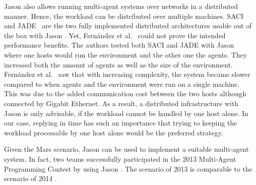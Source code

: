 Jason also allows running multi-agent systems over networks in a distributed manner. Hence, the workload can be distributed over multiple machines. SACI~\cite{hubner_saci_2000} and JADE~\cite{bellifemine_jade_2005} are the two fully implemented distributed architectures usable out of the box with Jason \cite{bordini_programming_2007}. Yet, Fernández et al.~\cite{fernandez_evaluating_2010} could not prove the intended performance benefits. The authors tested both SACI and JADE with Jason where one hosts would run the environment and the other one the agents. They increased both the amount of agents as well as the size of the environment. Fernández et al.~\cite{fernandez_evaluating_2010} saw that with increasing complexity, the system became slower compared to when agents and the environment were run on a single machine. This was due to the added communication cost between the two hosts although connected by Gigabit Ethernet. As a result, a distributed infrastructure with Jason is only advisable, if the workload cannot be handled by one host alone. In our case, replying in time has such an importance that trying to keeping the workload processable by one host alone would be the preferred strategy.

Given the Mars scenario, Jason can be used to implement a suitable multi-agent system. In fact, two teams successfully participated in the 2013 Multi-Agent Programming Contest by using Jason \cite{ahlbrecht_multi_2013}.%
The scenario of 2013 is comparable to the scenario of 2014 \cite{ahlbrecht_mapc_2014}. %
